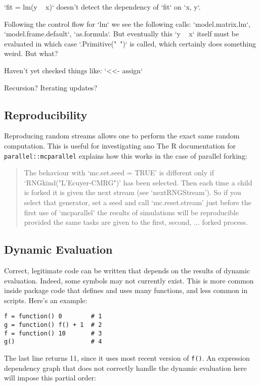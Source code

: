 \documentclass[12pt]{article}
\begin{document}
`fit = lm(y ~ x)` doesn't detect the dependency of `fit` on `x, y`.

Following the control flow for `lm` we see the following calls:
`model.matrix.lm`, `model.frame.default`, `as.formula`. But eventually this
`y ~ x` itself must be evaluated in which case `.Primitive("~")` is called,
which certainly does something weird. But what?

Haven't yet checked things like:
`<<- assign`

Recursion? Iterating updates?


\subsection{Reproducibility}

Reproducing random streams allows one to perform the exact same random
computation. This is useful for investigating ano The R documentation for
\texttt{parallel::mcparallel} explains how this works in the case of
parallel forking:

\begin{quote}
     The behaviour with ‘mc.set.seed = TRUE’ is different only if
     ‘RNGkind("L'Ecuyer-CMRG")’ has been selected.  Then each time a child
     is forked it is given the next stream (see ‘nextRNGStream’).  So if
     you select that generator, set a seed and call ‘mc.reset.stream’ just
     before the first use of ‘mcparallel’ the results of simulations will
     be reproducible provided the same tasks are given to the first,
     second, ...  forked process.
\end{quote}

\subsection{Dynamic Evaluation}

Correct, legitimate code can be written that depends on the results of
dynamic evaluation. Indeed, some symbols may not currently exist. This is
more common inside package code that defines and uses many functions, and
less common in scripts.  Here's an example:

\begin{verbatim}
f = function() 0        # 1
g = function() f() + 1  # 2
f = function() 10       # 3
g()                     # 4
\end{verbatim}

The last line returns 11, since it uses most recent version of \texttt{f()}.
An expression dependency graph that does not correctly handle the dynamic
evaluation here will impose this partial order:
\end{document}
